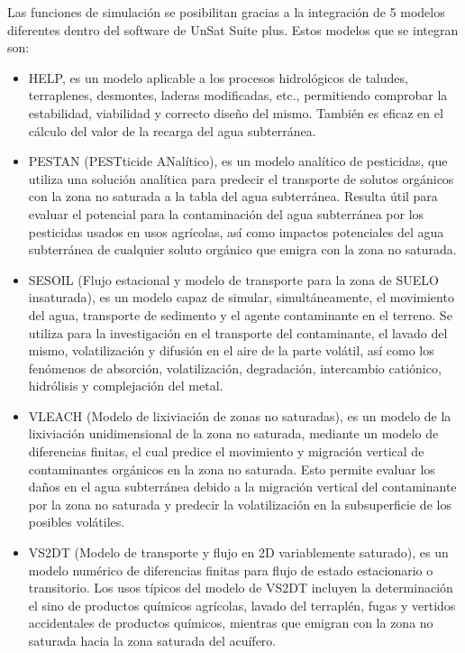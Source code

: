 Las funciones de simulación se posibilitan gracias a la integración de 5 modelos diferentes dentro del software de UnSat Suite plus. Estos modelos que se integran son:
\begin{itemize}
	\item HELP, es un modelo aplicable a los procesos hidrológicos de taludes, terraplenes, desmontes, laderas modificadas, etc., permitiendo comprobar la estabilidad, viabilidad y correcto diseño del mismo. También es eficaz en el cálculo del valor de la recarga del agua subterránea.
	\item PESTAN (PESTticide ANalítico), es un modelo analítico de pesticidas, que utiliza una solución analítica para predecir el transporte de solutos orgánicos con la zona no saturada a la tabla del agua subterránea. Resulta útil para evaluar el potencial para la contaminación del agua subterránea por los pesticidas usados en usos agrícolas, así como impactos potenciales del agua subterránea de cualquier soluto orgánico que emigra con la zona no saturada.
	\item SESOIL (Flujo estacional y modelo de transporte para la zona de SUELO insaturada), es un modelo capaz de simular, simultáneamente, el movimiento del agua, transporte de sedimento y el agente contaminante en el terreno. Se utiliza para la investigación en el transporte del contaminante, el lavado del mismo, volatilización y difusión en el aire de la parte volátil, así como los fenómenos de absorción, volatilización, degradación, intercambio catiónico, hidrólisis y complejación del metal.
	\item VLEACH (Modelo de lixiviación de zonas no saturadas), es un modelo de la lixiviación unidimensional de la zona no saturada, mediante un modelo de diferencias finitas, el cual predice el movimiento y migración vertical de contaminantes orgánicos en la zona no saturada. Esto permite evaluar los daños en el agua subterránea debido a la migración vertical del contaminante por la zona no saturada y predecir la volatilización en la subsuperficie de los posibles volátiles.
	\item VS2DT (Modelo de transporte y flujo en 2D variablemente saturado), es un modelo numérico de diferencias finitas para flujo de estado estacionario o transitorio. Los usos típicos del modelo de VS2DT incluyen la determinación el sino de productos químicos agrícolas, lavado del terraplén, fugas y vertidos accidentales de productos químicos, mientras que emigran con la zona no saturada hacia la zona saturada del acuífero.
\end{itemize}

